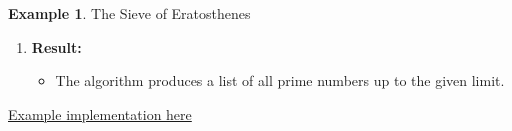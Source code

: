 \documentclass[letterpaper,10pt]{article}
\theoremstyle{plain}
\theoremstyle{definition}
\newtheorem{exmp}[thm]{Example}
\theoremstyle{remark}
\begin{document}
\begin{exmp}{The Sieve of Eratosthenes}
\begin{enumerate}
  \item \textbf{Result:}
    \begin{itemize}
      \item The algorithm produces a list of all prime numbers up to the given limit.
    \end{itemize}
\end{enumerate}
\href{https://pythontutor.com/render.html#code=def%20sieve_of_eratosthenes%28limit%29%3A%0A%20%20%20%20primes%20%3D%20%5B%5D%0A%20%20%20%20is_prime%20%3D%20%5B1%5D%20*%20%28limit%20%2B%201%29%0A%20%20%20%20is_prime%5B0%5D%20%3D%20is_prime%5B1%5D%20%3D%200%0A%0A%20%20%20%20for%20number%20in%20range%282,%20int%28limit**0.5%29%20%2B%201%29%3A%0A%20%20%20%20%20%20%20%20if%20is_prime%5Bnumber%5D%3A%0A%20%20%20%20%20%20%20%20%20%20%20%20primes.append%28number%29%0A%20%20%20%20%20%20%20%20%20%20%20%20for%20multiple%20in%20range%28number%20*%20number,%20limit%20%2B%201,%20number%29%3A%0A%20%20%20%20%20%20%20%20%20%20%20%20%20%20%20%20is_prime%5Bmultiple%5D%20%3D%200%0A%0A%20%20%20%20for%20number%20in%20range%28int%28limit**0.5%29%20%2B%201,%20limit%20%2B%201%29%3A%0A%20%20%20%20%20%20%20%20if%20is_prime%5Bnumber%5D%3A%0A%20%20%20%20%20%20%20%20%20%20%20%20primes.append%28number%29%0A%0A%20%20%20%20return%20primes%0A%0A%23%20Example%20usage%3A%0Alimit%20%3D%2020%0Aresult%20%3D%20sieve_of_eratosthenes%28limit%29%0Aprint%28%22Prime%20numbers%20up%20to%22,%20limit,%20%22are%3A%22,%20result%29&cumulative=true&curInstr=0&heapPrimitives=false&mode=display&origin=opt-frontend.js&py=3&rawInputLstJSON=%5B%5D&textReferences=true}{Example implementation here}
\end{exmp}
\end{document}
